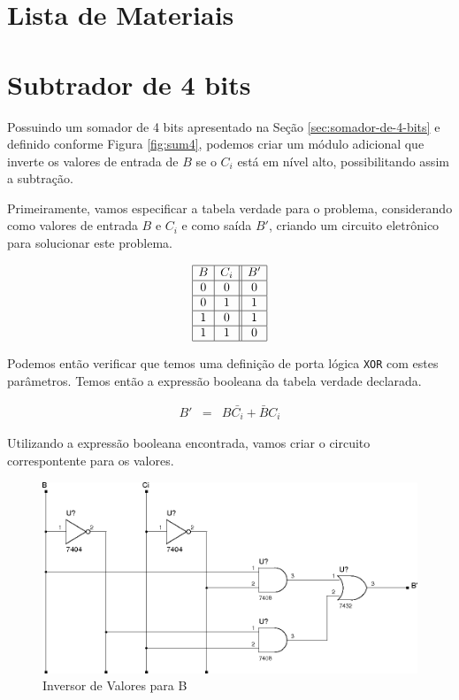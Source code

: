 \documentclass{article}
\newcommand{\n}[1]{\bar{#1}}
\begin{document}
\section{Lista de Materiais}
\label{sec:lista-de-materiais}

\section{Subtrador de 4 bits}
\label{sec:subtrador-de-4-bits}

Possuindo um somador de 4 bits apresentado na Seção \ref{sec:somador-de-4-bits}
e definido conforme Figura \ref{fig:sum4}, podemos criar um módulo adicional que
inverte os valores de entrada de $B$ se o $C_i$ está em nível alto,
possibilitando assim a subtração.

Primeiramente, vamos especificar a tabela verdade para o problema, considerando
como valores de entrada $B$ e $C_i$ e como saída $B'$, criando um circuito
eletrônico para solucionar este problema.

\begin{equation*}
    \begin{array}{|c|c||c|}
        \hline B & C_i & B'\\
        \hline 0 & 0 & 0\\
        \hline 0 & 1 & 1\\
        \hline 1 & 0 & 1\\
        \hline 1 & 1 & 0\\
        \hline
    \end{array}
\end{equation*}

Podemos então verificar que temos uma definição de porta lógica \texttt{XOR} com
estes parâmetros. Temos então a expressão booleana da tabela verdade declarada.

\begin{eqnarray*}
    B' &=& B\n{C_i} + \n{B}C_i
\end{eqnarray*}

Utilizando a expressão booleana encontrada, vamos criar o circuito
correspontente para os valores.

\begin{figure}
    \centering{}
    \includegraphics[scale=0.4]{sources/ci2.png}
    \caption{Inversor de Valores para B}
    \label{fig:ci2}
\end{figure}
\end{document}
